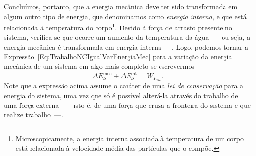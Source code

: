 Concluímos, portanto, que a energia mecânica deve ter sido transformada em algum outro tipo de energia, que denominamos como \emph{energia interna}, e que está relacionada à temperatura do corpo\footnote{Microscopicamente, a energia interna associada à temperatura de um corpo está relacionada à velocidade média das partículas que o compõe.}. Devido à força de arrasto presente no sistema, verifica-se que ocorre um aumento da temperatura da água ---~ou seja, a energia mecânica é transformada em energia interna~---. Logo, podemos tornar a Expressão~\eqref{Eq:TrabalhoNCIgualVarEnergiaMec} para a variação da energia mecânica de um sistema em algo mais completo se escrevermos
\begin{equation}\label{Eq:ConservacaoDaEnergia1}
    \Delta E_S^{\textrm{mec}} + \Delta E_S^{\textrm{int}} = W_{F_{\textrm{ext}}}.
\end{equation}
%
Note que a expressão acima assume o caráter de uma \emph{lei de conservação} para a energia do sistema, uma vez que só é possível alterá-la através do trabalho de uma força externa ---~ isto é, de uma força que cruza a fronteira do sistema e que realize trabalho~---.

